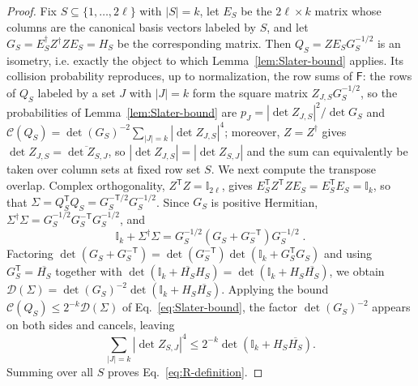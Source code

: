 \documentclass[prx,twocolumn,superscriptaddress,aps,10pt, frontmatterverbose, reprint,footinbib,longbibliography=true]{revtex4-2}
\newcommand{\trans}{\mathsf{T}}
\begin{document}
\begin{proof}

Fix $S\subseteq\{1,\dots,2\ell\}$ with $|S|=k$, let $E_S$ be the $2\ell\times k$ matrix whose columns are the canonical basis vectors labeled by $S$, and let $G_S=E_S^\dagger Z^\dagger ZE_S=H_S$ be the corresponding matrix. Then $Q_S=ZE_SG_S^{-1/2}$ is an isometry, i.e. exactly the object to which Lemma~\ref{lem:Slater-bound} applies.
Its collision probability reproduces, up to normalization, the row sums of $\mathsf{F}$: the rows of $Q_S$ labeled by a set $J$ with $|J|=k$ form the square matrix $Z_{J,S}G_S^{-1/2}$, so the probabilities of Lemma~\ref{lem:Slater-bound} are $p_J=|\det Z_{J,S}|^2/\det G_S$ and $\mathcal{C}(Q_S)=\det(G_S)^{-2}\sum_{|J|=k}|\det Z_{J,S}|^4$; moreover, $Z=Z^\dagger$ gives $\det Z_{J,S}=\overline{\det Z_{S,J}}$, so $|\det Z_{J,S}|=|\det Z_{S,J}|$ and the sum can equivalently be taken over column sets at fixed row set $S$. We next compute the transpose overlap. Complex orthogonality, $Z^{\trans}Z=\mathbb{I}_{2\ell}$, gives $E_S^{\trans}Z^{\trans}ZE_S=E_S^{\trans}E_S=\mathbb{I}_k$, so that $\Sigma=Q_S^{\trans}Q_S=G_S^{-\trans/2}G_S^{-1/2}$. Since $G_S$ is positive Hermitian, $\Sigma^\dagger\Sigma=G_S^{-1/2}G_S^{-\trans}G_S^{-1/2}$, and
\begin{equation}
\mathbb{I}_k+\Sigma^\dagger\Sigma=G_S^{-1/2}\left(G_S+G_S^{-\trans}\right)G_S^{-1/2}\;.
\end{equation}%
Factoring $\det(G_S+G_S^{-\trans})=\det(G_S^{-\trans})\det(\mathbb{I}_k+G_S^{\trans}G_S)$ and using $G_S^{\trans}=\overline{H_S}$ together with $\det(\mathbb{I}_k+\overline{H_S}H_S)=\det(\mathbb{I}_k+H_S\overline{H_S})$, we obtain $\mathcal{D}(\Sigma)=\det(G_S)^{-2}\det(\mathbb{I}_k+H_S\overline{H_S})$. Applying the bound $\mathcal{C}(Q_S)\le2^{-k}\mathcal{D}(\Sigma)$ of Eq.~\eqref{eq:Slater-bound}, the factor $\det(G_S)^{-2}$ appears on both sides and cancels, leaving
\begin{equation}
    \sum_{|J|=k}\left|\det Z_{S,J}\right|^4\le 2^{-k}\det\!\left(\mathbb{I}_k+H_S\overline{H_S}\right).
\end{equation}
Summing over all $S$ proves Eq.~\eqref{eq:R-definition}.


\end{proof}
\end{document}
